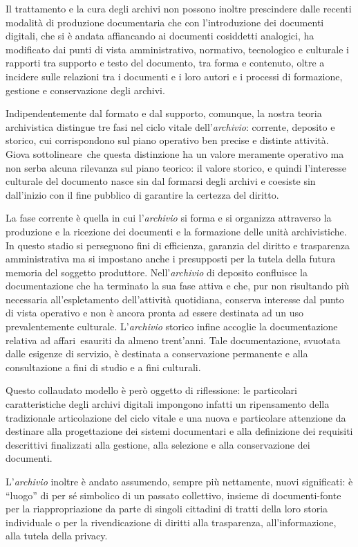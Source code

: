 \documentclass[
  b5paper,
  twoside,
  11pt,
  chapterprefix=false,
  bibliography=totocnumbered,
  listof=flat]{scrbook}
\begin{document}
Il trattamento e la cura degli archivi non possono inoltre prescindere
dalle recenti modalità di produzione documentaria che con l'introduzione
dei documenti digitali, che si è andata affiancando ai documenti
cosiddetti analogici, ha modificato dai punti di vista amministrativo,
normativo, tecnologico e culturale i rapporti tra supporto e testo del
documento, tra forma e contenuto, oltre a incidere sulle relazioni tra i
documenti e i loro autori e i processi di formazione, gestione e
conservazione degli archivi.

Indipendentemente dal formato e dal supporto, comunque, la nostra teoria
archivistica distingue tre fasi nel ciclo vitale dell'\emph{archivio}:
corrente, deposito e storico, cui corrispondono sul piano operativo ben
precise e distinte attività. Giova sottolineare~che questa distinzione
ha un valore meramente operativo ma non serba alcuna rilevanza sul piano
teorico: il valore storico, e quindi l'interesse culturale del documento
nasce sin dal formarsi degli archivi e coesiste sin dall'inizio con il
fine pubblico di garantire la certezza del diritto.

La fase corrente è quella in cui l'\emph{archivio} si forma e si organizza
attraverso la produzione e la ricezione dei documenti e la formazione
delle unità archivistiche. In questo stadio si perseguono fini di
efficienza, garanzia del diritto e trasparenza amministrativa ma si
impostano anche i presupposti per la tutela della futura memoria del
soggetto produttore. Nell'\emph{archivio} di deposito confluisce la
documentazione che ha terminato la sua fase attiva e che, pur non
risultando più necessaria all'espletamento dell'attività quotidiana,
conserva interesse dal punto di vista operativo e non è ancora pronta ad
essere destinata ad un uso prevalentemente culturale. L'\emph{archivio}
storico infine accoglie la documentazione relativa ad affari~esauriti da
almeno trent'anni. Tale documentazione, svuotata dalle esigenze di
servizio, è destinata a conservazione permanente e alla consultazione a
fini di studio e a fini culturali.

Questo collaudato modello è però oggetto di riflessione: le particolari
caratteristiche degli archivi digitali impongono infatti un ripensamento
della tradizionale articolazione del ciclo vitale e una nuova e
particolare attenzione da destinare alla progettazione dei sistemi
documentari e alla definizione dei requisiti descrittivi finalizzati
alla gestione, alla selezione e alla conservazione dei documenti.

L'\emph{archivio} inoltre è andato assumendo, sempre più nettamente, nuovi
significati: è \enquote{luogo} di per sé simbolico di un passato collettivo,
insieme di documenti-fonte per la riappropriazione da parte di singoli
cittadini di tratti della loro storia individuale o per la
rivendicazione di diritti alla trasparenza, all'informazione, alla
tutela della privacy.
\end{document}
